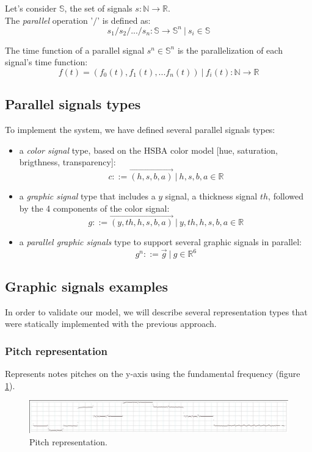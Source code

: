 \documentclass{article}
\begin{document}
Let's consider $\mathbb{S}$, the set of signals $s : \mathbb{N} \rightarrow \mathbb{R}$. \\
The \emph{parallel} operation '$/$' is defined as:
\begin{equation}
s_{1} / s_{2} / ... / s_{n} : \mathbb{S} \rightarrow \mathbb{S}^n\ |\ s_i \in \mathbb{S}
\end{equation}

The time function of a parallel signal $s^n \in \mathbb{S}^n$ is the parallelization of each signal's time function:
\begin{equation}
f(t) = (f_0(t), f_1(t), ... f_n(t))\ |\ f_i(t) :  \mathbb{N} \rightarrow \mathbb{R}
\end{equation}


\subsection{Parallel signals types}
To implement the system, we have defined several parallel signals types:
\begin{itemize}
	\item a \emph{color signal} type, based on the HSBA color model [hue, saturation, brigthness, transparency]:
	\[c ::= \overrightarrow{(h, s , b, a)} \ |\  h, s , b, a \in \mathbb{R}\] 
	\item a \emph{graphic signal} type that includes a $y$ signal, a thickness signal $th$,
	followed by the 4 components of the color signal:
	\[g ::= \overrightarrow{(y, th, h, s , b, a)} \ |\  y, th, h, s , b, a \in \mathbb{R}\]
	\item a \emph{parallel graphic signals} type to support several graphic signals in parallel: 
	\[g^n ::= \overrightarrow{g} \ |\  g \in \mathbb{R}^6\]
\end{itemize}


\subsection{Graphic signals examples}
In order to validate our model, we will describe several representation types that were statically implemented with the previous approach.
 
\subsubsection{Pitch representation}
Represents notes pitches on the y-axis using the fundamental frequency (figure \ref{fig:pitch}).
\begin{figure}[htbp]
\centerline{
	\includegraphics[width=0.99\columnwidth]{imgs/curves/pitch}}
\caption{Pitch representation.}
\label{fig:pitch}
\end{figure}
\end{document}
